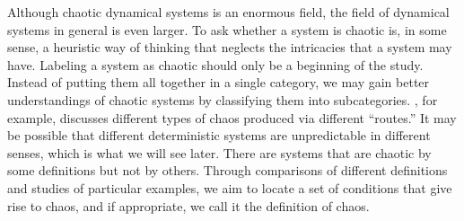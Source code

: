 \documentclass[10pt,twoside,draft]{book}
\begin{document}
Although chaotic dynamical systems is an enormous field, the field of dynamical systems in general is even larger.
To ask whether a system is chaotic is, in some sense, a heuristic way of thinking that neglects the intricacies that a system may have.
Labeling a system as chaotic should only be a beginning of the study.
Instead of putting them all together in a single category, we may gain better understandings of chaotic systems by classifying them into subcategories.
\citet{devaney}, for example, discusses different types of chaos produced via different ``routes.''
It may be possible that different deterministic systems are unpredictable in different senses, which is what we will see later.
There are systems that are chaotic by some definitions but not by others.
Through comparisons of different definitions and studies of particular examples, we aim to locate a set of conditions that give rise to chaos, and if appropriate, we call it the definition of chaos.



\end{document}
